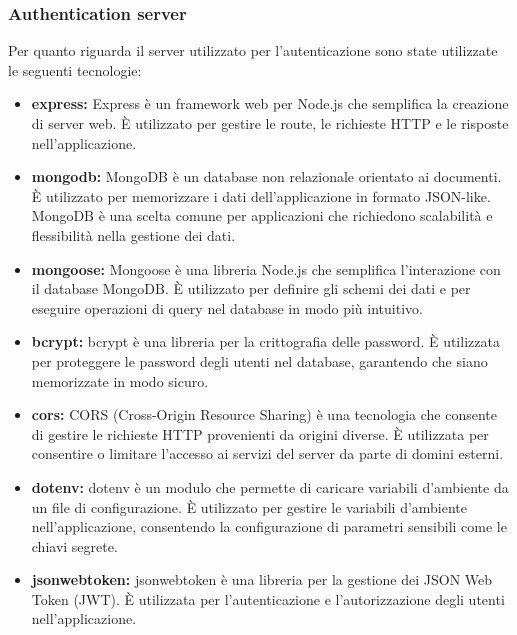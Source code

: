 \subsubsection{Authentication server}

Per quanto riguarda il server utilizzato per l'autenticazione sono state utilizzate le seguenti tecnologie:

\begin{itemize}

    \item \textbf{express:} Express è un framework web per Node.js che semplifica
          la creazione di server web. È utilizzato per gestire le route, le richieste
          HTTP e le risposte nell'applicazione.

    \item \textbf{mongodb:} MongoDB è un database non relazionale orientato ai
          documenti. È utilizzato per memorizzare i dati dell'applicazione in formato
          JSON-like. MongoDB è una scelta comune per applicazioni che richiedono scalabilità
          e flessibilità nella gestione dei dati.

    \item \textbf{mongoose:} Mongoose è una libreria Node.js che semplifica l'interazione
          con il database MongoDB. È utilizzato per definire gli schemi dei dati e per
          eseguire operazioni di query nel database in modo più intuitivo.

    \item \textbf{bcrypt:} bcrypt è una libreria per la crittografia delle password.
          È utilizzata per proteggere le password degli utenti nel database, garantendo che
          siano memorizzate in modo sicuro.

    \item \textbf{cors:} CORS (Cross-Origin Resource Sharing) è una tecnologia che
          consente di gestire le richieste HTTP provenienti da origini diverse. È utilizzata
          per consentire o limitare l'accesso ai servizi del server da parte di domini esterni.

    \item \textbf{dotenv:} dotenv è un modulo che permette di caricare variabili
          d'ambiente da un file di configurazione. È utilizzato per gestire le variabili
          d'ambiente nell'applicazione, consentendo la configurazione di parametri
          sensibili come le chiavi segrete.

    \item \textbf{jsonwebtoken:} jsonwebtoken è una libreria per la gestione dei
          JSON Web Token (JWT). È utilizzata per l'autenticazione e l'autorizzazione
          degli utenti nell'applicazione.

\end{itemize}




